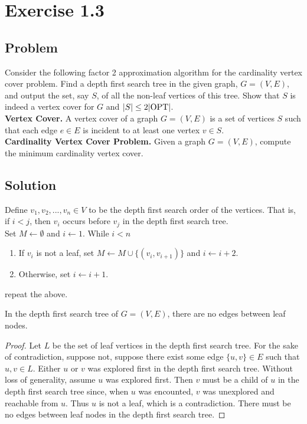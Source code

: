 \documentclass{article}
\begin{document}
\section*{Exercise 1.3}

\subsection*{Problem}

Consider the following factor 2 approximation algorithm for the cardinality vertex cover
problem. Find a depth first search tree in the given graph, $G = (V, E)$, and output the 
set, say $S$, of all the non-leaf vertices of this tree. Show that $S$ is indeed a 
vertex cover for $G$ and $|S| \leq 2 |\mathrm{OPT}|$. \\

\textbf{Vertex Cover.} A vertex cover of a graph $G = (V, E)$ is a set of vertices $S$
such that each edge $e \in E$ is incident to at least one vertex $v \in S$. \\

\textbf{Cardinality Vertex Cover Problem.} Given a graph $G = (V, E)$, compute the 
minimum cardinality vertex cover.

\subsection*{Solution}

Define $v_1, v_2, ..., v_n \in V$ to be the depth first search order of the vertices. 
That is, if $i < j$, then $v_i$ occurs before $v_j$ in the depth first search tree. \\

\noindent
Set $M \gets \emptyset$ and $i \gets 1$. While $i < n$
\begin{enumerate}
    \item If $v_i$ is not a leaf, set $M \gets M \cup \{(v_i, v_{i+1})\}$ and 
    $i \gets i + 2$.
    \item Otherwise, set $i \gets i + 1$.
\end{enumerate}
repeat the above.

\begin{lemma*}
    In the depth first search tree of $G = (V, E)$, there are no edges between leaf 
    nodes.
\end{lemma*}

\begin{proof}
    Let $L$ be the set of leaf vertices in the depth first search tree. For the sake of
    contradiction, suppose not, suppose there exist some edge $\{u, v\} \in E$ such that
    $u, v \in L$. Either $u$ or $v$ was explored first in the depth first search tree.
    Without loss of generality, assume $u$ was explored first. Then $v$ must be a child
    of $u$ in the depth first search tree since, when $u$ was encounted, $v$ was 
    unexplored and reachable from $u$. Thus $u$ is not a leaf, which is a contradiction. 
    There must be no edges between leaf nodes in the depth first search tree.
\end{proof}
\end{document}
